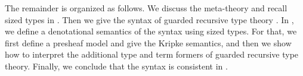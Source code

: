 The remainder is organized as follows.
We discuss the meta-theory and recall sized types in .
Then we give the syntax of guarded recursive type theory .
In , we define a denotational semantics of the syntax using sized types.  
For that, we first define a presheaf model and give the Kripke semantics, and then we show how to interpret the additional type and term formers of guarded recursive type theory.
Finally, we conclude that the syntax is consistent in .






